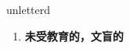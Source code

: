
\begin{frame}
{\huge unletterd}
\begin{center}
\begin{enumerate}\Large
  \item \textbf{未受教育的，文盲的}
\end{enumerate}
\end{center}
\end{frame}
